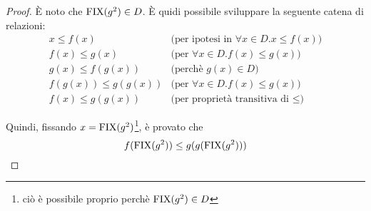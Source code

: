 \begin{proof}
È noto che $\textrm{\normalfont{FIX}}(g^2)\in D$. È quidi possibile sviluppare la seguente catena
di relazioni:
$$
\begin{array}{lr}
x \leq f(x) & \text{(per ipotesi in $\forall{x}\in D.x \leq{} f(x)$)} \\
f(x) \leq g(x) & \text{(per $\forall{x}\in D. f(x) \leq{} g(x)$)} \\
g(x) \leq f(g(x)) & \text{(perchè $g(x)\in D$)} \\
f(g(x)) \leq g(g(x)) & \text{(per $\forall{x}\in D. f(x) \leq{} g(x)$)} \\
f(x) \leq g(g(x)) &  \text{(per proprietà transitiva di $\leq$)}
\end{array}
$$

Quindi, fissando $x = \textrm{\normalfont{FIX}}(g^2)$\footnote{ciò è possibile proprio perchè
$\textrm{\normalfont{FIX}}(g^2)\in D$}, è provato che
$$
f(\textrm{\normalfont{FIX}}(g^2)) \leq g(g(\textrm{\normalfont{FIX}}(g^2)))
$$

\end{proof}
